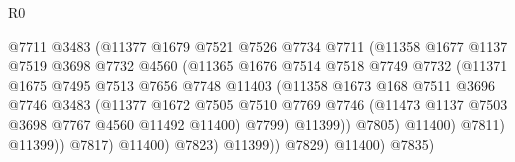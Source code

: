\begin{lexlean}{R0}
\begin{coremodule}
                                    @7711
                                    @3483
                                    (@11377
                                      @1679
                                      @7521
                                      @7526
                                      @7734
                                      @7711
                                      (@11358
                                        @1677
                                        @1137
                                        @7519
                                        @3698
                                        @7732
                                        @4560
                                        (@11365
                                          @1676
                                          @7514
                                          @7518
                                          @7749
                                          @7732
                                          (@11371
                                            @1675
                                            @7495
                                            @7513
                                            @7656
                                            @7748
                                            @11403
                                            (@11358
                                              @1673
                                              @168
                                              @7511
                                              @3696
                                              @7746
                                              @3483
                                              (@11377
                                                @1672
                                                @7505
                                                @7510
                                                @7769
                                                @7746
                                                (@11473 @1137 @7503 @3698 @7767 @4560 @11492 @11400)
                                                @7799)
                                              @11399))
                                          @7805)
                                        @11400)
                                      @7811)
                                    @11399))
                                @7817)
                              @11400)
                            @7823)
                          @11399))
                      @7829)
                    @11400)
                  @7835)

\end{coremodule}
\end{lexlean}
